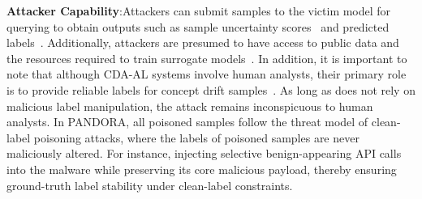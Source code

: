 \textbf{Attacker Capability}:Attackers can submit samples to the victim model for querying to obtain outputs such as sample uncertainty scores~\cite{2025-Baidu-Image-Recognition} and predicted labels~\cite{Virustotaluploadinterface}.
Additionally, attackers are presumed to have access to public data and the resources required to train surrogate models~\cite{2023-AAAI-surrogate-model-for-adversarial-attack}.
In addition, it is important to note that although CDA-AL systems involve human analysts, their primary role is to provide reliable labels for concept drift samples~\cite{2023-Usenix-chenyizhen}.
As long as \pandora does not rely on malicious label manipulation, the attack remains inconspicuous to human analysts.
In PANDORA, all poisoned samples follow the threat model of clean-label poisoning attacks, where the labels of poisoned samples are never maliciously altered.
For instance, injecting selective benign-appearing API calls into the malware while preserving its core malicious payload, thereby ensuring ground-truth label stability under clean-label constraints.
